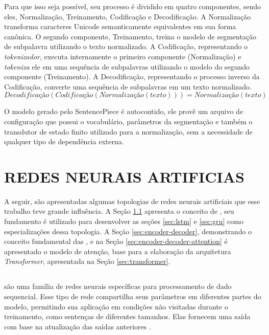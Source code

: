 Para que isso seja possível, seu processo é dividido em quatro componentes, sendo eles, Normalização, Treinamento, Codificação e Decodificação. A Normalização transforma caracteres Unicode semanticamente equivalentes em sua forma canônica. O segundo componente, Treinamento, treina o modelo de segmentação de subpalavra utilizando o texto normalizado. A Codificação, representando o \textit{tokenizador}, executa internamente o primeiro componente (Normalização) e \textit{tokeniza} ele em uma sequência de subpalavras utilizando o modelo do segundo componente (Treinamento). A Decodificação, representando o processo inverso da Codificação, converte uma sequência de subpalavras em um texto normalizado.
\begin{equation}
    \label{eq:sentencepiece-lossless}
    \textit{Decodificação}(\textit{Codificação}(\textit{Normalização}(\textit{texto}))) = \textit{Normalização}(\textit{texto})
\end{equation}

O modelo gerado pelo SentencePiece é autocontido, ele provê um arquivo de configuração que possui o vocabulário, parâmetros da segmentação e também o transdutor de estado finito utilizado para a normalização, sem a necessidade de qualquer tipo de dependência externa.

\section{REDES NEURAIS ARTIFICIAS}
\label{sec:pln-redes-neurais-artificiais}

A seguir, são apresentadas algumas topologias de redes neurais artificiais que esse trabalho teve grande influência. A Seção \ref{sec:rnn} apresenta o conceito de , seu fundamento é utilizado para desenvolver as seções \ref{sec:lstm} e \ref{sec:gru} como especializações dessa topologia. A Seção \ref{sec:encoder-decoder}, demonstrando o conceito fundamental das , e na Seção \ref{sec:encoder-decoder-attention} é apresentado o modelo de atenção, base para a elaboração da arquitetura \textit{Transformer}, apresentada na Seção \ref{sec:transformer}.

\subsection{}
\label{sec:rnn}

 são uma família de redes neurais específicas para processamento de dado sequencial. Esse tipo de rede compartilha seus parâmetros em diferentes partes do modelo, permitindo sua aplicação em condições não visitadas durante o treinamento, como sentenças de diferentes tamanhos. Elas fornecem uma saída com base na atualização das saídas anteriores \cite{Goodfellow2016DeepLearning}.


